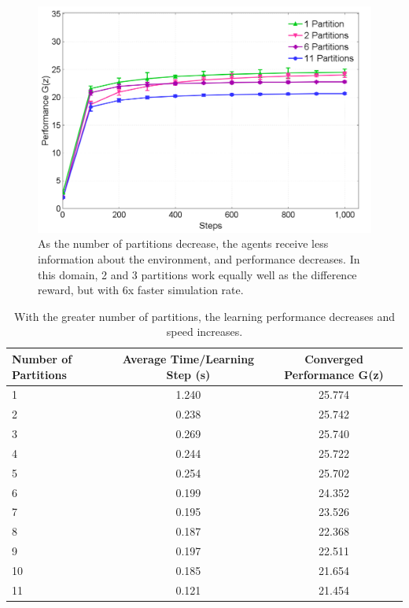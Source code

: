\documentclass[onehalf,11pt]{beavtex}
\begin{document}
\begin{figure}
\centering
\includegraphics[width=1.0\columnwidth]{BarProblemNewPartitions}
\caption{As the number of partitions decrease, the agents receive less information about the environment, and performance decreases. In this domain, 2 and 3 partitions work equally well as the difference reward, but with 6x  faster simulation rate.}
\label{BarProblemNewPartitions}
\end{figure}

\begin{table}
\begin{tabular}{|l|c|c|}
\hline
Number of Partitions & Average Time/Learning Step (s) & Converged Performance G(z)\\
\hline
1 & 1.240 & 25.774 \\
\hline
2 & 0.238 & 25.742 \\
\hline
3 & 0.269 & 25.740 \\
\hline
4 & 0.244 & 25.722 \\
\hline
5 & 0.254 & 25.702 \\
\hline
6 & 0.199 & 24.352 \\
\hline
7 & 0.195 & 23.526 \\
\hline
8 & 0.187 & 22.368 \\
\hline
9 & 0.197 & 22.511 \\
\hline
10 & 0.185 & 21.654 \\
\hline
11 & 0.121 & 21.454 \\
\hline
\end{tabular}
\caption{With the greater number of partitions, the learning performance decreases and speed increases.}
\label{BarProblemTable}
\end{table}
\end{document}
